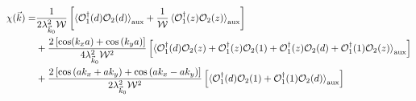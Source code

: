 \documentclass{report}
\numberwithin{equation}{section}
\begin{document}
\begin{equation}\begin{aligned}
	\chi(\vec k)=& \frac{1}{2\lambda_{\vec k_0}^2 \mathcal{W}}\left[\braket{\mathcal{O}_1^\dagger(d) \mathcal{O}_2(d)}_\text{aux} + \frac{1}{\mathcal{W}}\braket{\mathcal{O}_1^\dagger(z) \mathcal{O}_2(z)}_\text{aux}\right]\\
		    &+ \frac{2\left[\cos(k_x a) + \cos\left(k_y a\right)\right]}{4\lambda_{\vec k_0}^2 \mathcal{W}^2}\left[\braket{\mathcal{O}_1^\dagger(d) \mathcal{O}_2(z) + \mathcal{O}_1^\dagger(z) \mathcal{O}_2(1) + \mathcal{O}_1^\dagger(z) \mathcal{O}_2(d) + \mathcal{O}_1^\dagger(1) \mathcal{O}_2(z)}_\text{aux}\right] \\
		    &+ \frac{2\left[\cos \left(ak_x + ak_y\right) + \cos \left( ak_x - ak_y \right) \right]}{2\lambda_{\vec k_0}^2 \mathcal{W}^2}\left[\braket{\mathcal{O}_1^\dagger(d) \mathcal{O}_2(1) + \mathcal{O}_1^\dagger(1) \mathcal{O}_2(d)}_\text{aux}\right] 
\end{aligned}\end{equation}
\end{document}

